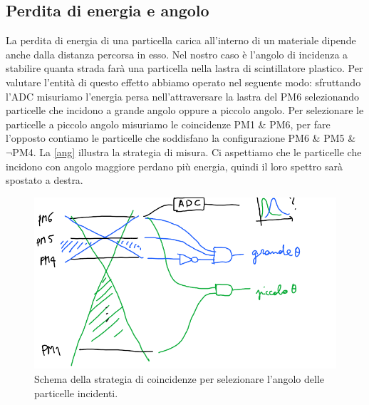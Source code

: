 \subsection{Perdita di energia e angolo}   %

La perdita di energia di una particella carica all'interno di un materiale dipende anche dalla distanza percorsa in esso.
Nel nostro caso è l'angolo di incidenza a stabilire quanta strada farà una particella nella lastra di scintillatore plastico. Per valutare l'entità di questo effetto abbiamo operato nel seguente modo: sfruttando l'ADC misuriamo l'energia persa nell'attraversare la lastra del PM6 selezionando particelle che incidono a grande angolo oppure a piccolo angolo.
Per selezionare le particelle a piccolo angolo misuriamo le coincidenze PM1 \& PM6, per fare l'opposto contiamo le particelle che soddisfano la configurazione PM6 \& PM5 \& $\neg$PM4.
La \autoref{ang} illustra la strategia di misura. Ci aspettiamo che le particelle che incidono con angolo maggiore perdano più energia, quindi il loro spettro sarà spostato a destra.

\begin{figure}
\centering
\includegraphics[width=8 cm]{ang}
\caption{Schema della strategia di coincidenze per selezionare l'angolo delle particelle incidenti.}
\label{ang}
\end{figure}

